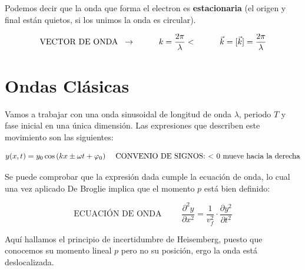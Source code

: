 \documentclass{report}
\begin{document}
    \vspace{0.8cm}
    \noindent Podemos decir que la onda que forma el electron es \textbf{estacionaria} 
    (el origen y final están quietos, si los unimos la onda es circular).

    \noindent \[\text{VECTOR DE ONDA}\hspace{0.2cm} \rightarrow \hspace{1cm} k=
    \dfrac{2\pi}{\lambda}<   \hspace{1cm}\vec{k}=[\vec{k}]=\dfrac{2\pi}
    {\lambda}\]

\clearpage

  \section{Ondas Clásicas}
    \noindent Vamos a trabajar con una onda sinusoidal de longitud de onda $\lambda$, 
    periodo $T$ y fase inicial en una única dimensión. Las expresiones que describen 
    este movimiento son las siguientes:

    \begin{equation}
      y(x,t)=y_0\cos\left(kx\pm \omega t+\varphi_0\right) \hspace{0.4cm} 
      \text{CONVENIO DE SIGNOS: <\ 0 mueve hacia la derecha}
    \end{equation}

    \vspace{0.15cm}

    \noindent Se puede comprobar que la expresión dada cumple la ecuación de onda, 
    lo cual una vez aplicado De Broglie implica que el momento $p$ está bien definido:

    \begin{equation}
      \text{ECUACIÓN DE ONDA}\hspace{1cm} \dfrac{\partial^2y}{\partial x^2}=\dfrac{1}{v_f^2}\cdot
      \dfrac{\partial y^2}{\partial t^2}
    \end{equation}
    
    \noindent Aquí hallamos el principio de incertidumbre de Heisemberg, puesto que 
    conocemos su momento lineal $p$ pero no su posición, ergo la onda está 
    deslocalizada.
\end{document}
